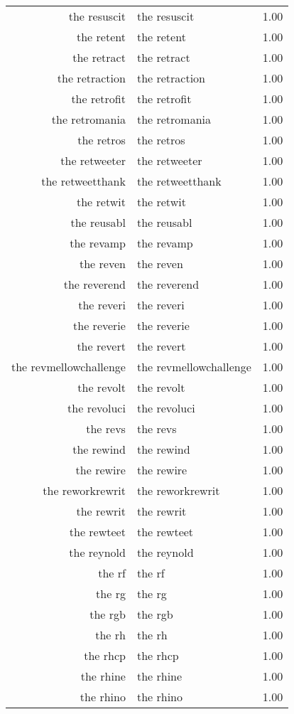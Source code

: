 \begin{table}[ht]
\begin{tabular}{rlr}
  the resuscit & the resuscit & 1.00 \\ 
  the retent & the retent & 1.00 \\ 
  the retract & the retract & 1.00 \\ 
  the retraction & the retraction & 1.00 \\ 
  the retrofit & the retrofit & 1.00 \\ 
  the retromania & the retromania & 1.00 \\ 
  the retros & the retros & 1.00 \\ 
  the retweeter & the retweeter & 1.00 \\ 
  the retweetthank & the retweetthank & 1.00 \\ 
  the retwit & the retwit & 1.00 \\ 
  the reusabl & the reusabl & 1.00 \\ 
  the revamp & the revamp & 1.00 \\ 
  the reven & the reven & 1.00 \\ 
  the reverend & the reverend & 1.00 \\ 
  the reveri & the reveri & 1.00 \\ 
  the reverie & the reverie & 1.00 \\ 
  the revert & the revert & 1.00 \\ 
  the revmellowchallenge & the revmellowchallenge & 1.00 \\ 
  the revolt & the revolt & 1.00 \\ 
  the revoluci & the revoluci & 1.00 \\ 
  the revs & the revs & 1.00 \\ 
  the rewind & the rewind & 1.00 \\ 
  the rewire & the rewire & 1.00 \\ 
  the reworkrewrit & the reworkrewrit & 1.00 \\ 
  the rewrit & the rewrit & 1.00 \\ 
  the rewteet & the rewteet & 1.00 \\ 
  the reynold & the reynold & 1.00 \\ 
  the rf & the rf & 1.00 \\ 
  the rg & the rg & 1.00 \\ 
  the rgb & the rgb & 1.00 \\ 
  the rh & the rh & 1.00 \\ 
  the rhcp & the rhcp & 1.00 \\ 
  the rhine & the rhine & 1.00 \\ 
  the rhino & the rhino & 1.00 \\ 

\end{tabular}
\end{table}
